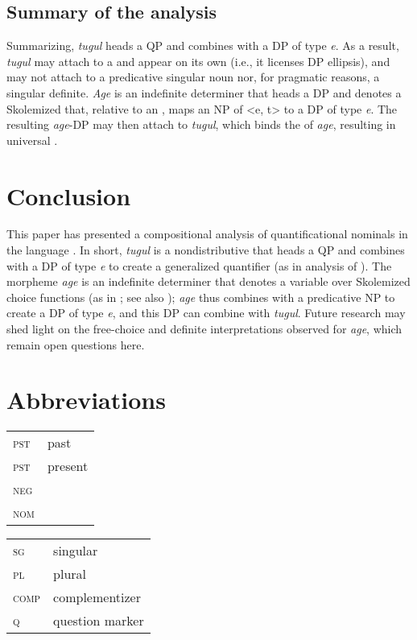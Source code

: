 \documentclass[output=paper]{LSP/langsci}
\begin{document}
\subsection{Summary of the analysis}
Summarizing, \textit{tugul} heads a QP and combines with a DP of type \textit{e}. As a result, \textit{tugul} may attach to a  and appear on its own (i.e., it licenses DP ellipsis), and may not attach to a predicative singular noun nor, for pragmatic reasons, a singular definite. \textit{Age} is an indefinite determiner that heads a DP and denotes a Skolemized  that, relative to an , maps an NP of <e, t> to a DP of type \textit{e}. The resulting \textit{age}-DP may then attach to \textit{tugul}, which binds the  of \textit{age}, resulting in universal .

\section{Conclusion} \label{sec:landman:conclusion}
This paper has presented a compositional analysis of quantificational nominals in the  language . In short, \textit{tugul} is a nondistributive  that heads a QP and combines with a DP of type \textit{e} to create a generalized quantifier (as in  analysis of ). The morpheme \textit{age} is an indefinite determiner that denotes a variable over Skolemized choice functions (as in \citealt{Kratzer:1998}; see also \citealt{Matthewson:1999,Matthewson:2001}); \textit{age} thus combines with a predicative NP to create a DP of type \textit{e}, and this DP can combine with \textit{tugul}. Future research may shed light on the free-choice and definite interpretations observed for \textit{age}, which remain open questions here.

\section*{Abbreviations}
\begin{tabularx}{.45\textwidth}{lQ}
\textsc{pst} & past \\
\textsc{pst} &present \\
\textsc{neg} &\\
\textsc{nom} &\\
\end{tabularx}
\begin{tabularx}{.45\textwidth}{lQ}
\textsc{sg}  &singular\\
\textsc{pl}  &plural\\
\textsc{comp}& complementizer\\
\textsc{q}   & question marker\\
\end{tabularx}
\end{document}
